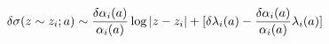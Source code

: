 \documentclass{article}
\begin{document}
\begin{equation}
  \delta\sigma(z\sim z_i;a) \sim{{\delta\alpha_i(a)}\over{\alpha_i(a)}}\log |z-z_i| + [\delta\lambda_i(a) -{{\delta\alpha_i(a)}\over{\alpha_i(a)}}\lambda_i(a)]
\end{equation}
\end{document}
